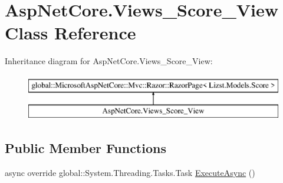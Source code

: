 \hypertarget{class_asp_net_core_1_1_views___score___view}{}\section{Asp\+Net\+Core.\+Views\+\_\+\+Score\+\_\+\+View Class Reference}
\label{class_asp_net_core_1_1_views___score___view}
Inheritance diagram for Asp\+Net\+Core.\+Views\+\_\+\+Score\+\_\+\+View\+:\begin{figure}[H]
\begin{center}
\leavevmode
\includegraphics[height=2.000000cm]{class_asp_net_core_1_1_views___score___view}
\end{center}
\end{figure}
\subsection*{Public Member Functions}
\begin{DoxyCompactItemize}
\item 
async override global\+::\+System.\+Threading.\+Tasks.\+Task \mbox{\hyperlink{class_asp_net_core_1_1_views___score___view_a36ba1880d8f4a6f7a89cc3b38ad3275b}{Execute\+Async}} ()
\end{DoxyCompactItemize}
